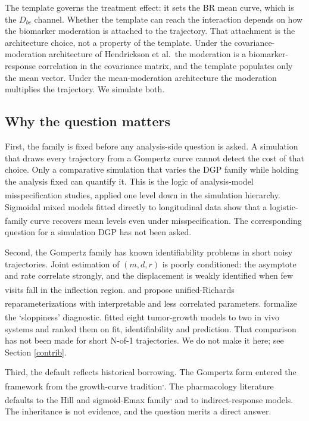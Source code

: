 \documentclass[
  11pt,
]{article}
\begin{document}
The template governs the treatment effect: it sets the BR mean curve,
which is the \(D_{bc}\) channel. Whether the template can reach the
interaction depends on how the biomarker moderation is attached to the
trajectory. That attachment is the architecture choice, not a property
of the template. Under the covariance-moderation architecture of
Hendrickson et al.~the moderation is a biomarker-response correlation
in the covariance matrix, and the template populates only the mean
vector. Under the mean-moderation architecture the moderation
multiplies the trajectory. We simulate both.

\subsection{Why the question matters}\label{why-the-question-matters}

First, the family is fixed before any analysis-side question is asked.
A simulation that draws every trajectory from a Gompertz curve cannot
detect the cost of that choice. Only a comparative simulation that
varies the DGP family while holding the analysis fixed can quantify
it. This is the logic of analysis-model misspecification studies\textsuperscript{}, applied one level down in the simulation
hierarchy. Sigmoidal mixed models fitted directly to longitudinal data
show that a logistic-family curve recovers mean levels even under
misspecification\textsuperscript{}. The corresponding question
for a simulation DGP has not been asked.

Second, the Gompertz family has known identifiability problems in
short noisy trajectories. Joint estimation of \((m, d, r)\) is poorly
conditioned: the asymptote and rate correlate strongly, and the
displacement is weakly identified when few visits fall in the
inflection region.\textsuperscript{} and\textsuperscript{} propose
unified-Richards reparameterizations with interpretable and less
correlated parameters.\textsuperscript{} formalize the
`sloppiness' diagnostic.\textsuperscript{} fitted eight
tumor-growth models to two in vivo systems and ranked them on fit,
identifiability and prediction. That comparison has not been made for
short N-of-1 trajectories. We do not make it here; see Section
\ref{contrib}.

Third, the default reflects historical borrowing. The Gompertz form
entered the framework from the growth-curve tradition\textsuperscript{,}. The pharmacology
literature defaults to the Hill and sigmoid-Emax family\textsuperscript{,} and to indirect-response models\textsuperscript{}. The inheritance is not evidence, and the
question merits a direct answer.
\end{document}
